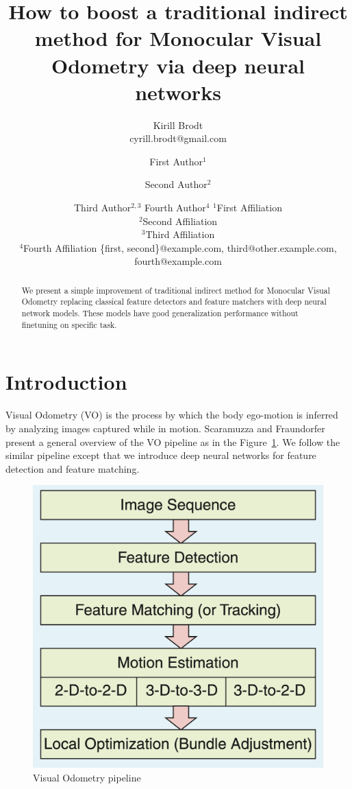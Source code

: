 \documentclass{article}
\title{How to boost a traditional indirect method for Monocular Visual Odometry
via deep neural networks}
\author{
    Kirill Brodt\\
    \affiliations
    \emails
    cyrill.brodt@gmail.com
}
\author{
First Author$^1$
\and
Second Author$^2$\and
Third Author$^{2,3}$\And
Fourth Author$^4$
\affiliations
$^1$First Affiliation\\
$^2$Second Affiliation\\
$^3$Third Affiliation\\
$^4$Fourth Affiliation
\emails
\{first, second\}@example.com,
third@other.example.com,
fourth@example.com
}
\begin{document}
\maketitle

\begin{abstract}
    We present a simple improvement of traditional indirect method for
    Monocular Visual Odometry replacing classical feature detectors and feature
    matchers with deep neural network models. These models have good
    generalization performance without finetuning on specific task.
\end{abstract}

\section{Introduction}

Visual Odometry (VO) is the process by which the body ego-motion is inferred by
analyzing images captured while in motion. Scaramuzza and
Fraundorfer~ present a general overview of the VO
pipeline as in the Figure~\ref{fig:vo_pipeline}. We follow the similar pipeline
except that we introduce deep neural networks for feature detection and feature
matching.

\begin{figure}
    \centering
    \includegraphics[width=1.0\linewidth]{./assets/pipeline.png}
    \caption{Visual Odometry pipeline \protect\cite{scaramuzza2011vop1}}
    \label{fig:vo_pipeline}
\end{figure}
\end{document}
